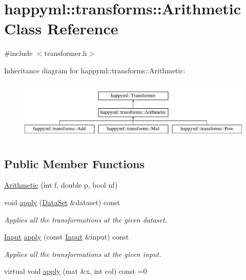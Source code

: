 \hypertarget{classhappyml_1_1transforms_1_1Arithmetic}{}\section{happyml\+:\+:transforms\+:\+:Arithmetic Class Reference}
\label{classhappyml_1_1transforms_1_1Arithmetic}


{\ttfamily \#include $<$transformer.\+h$>$}

Inheritance diagram for happyml\+:\+:transforms\+:\+:Arithmetic\+:\begin{figure}[H]
\begin{center}
\leavevmode
\includegraphics[height=2.886598cm]{classhappyml_1_1transforms_1_1Arithmetic}
\end{center}
\end{figure}
\subsection*{Public Member Functions}
\begin{DoxyCompactItemize}
\item 
\hyperlink{classhappyml_1_1transforms_1_1Arithmetic_a0a57820a202d232af4527a2bb4ecf67a}{Arithmetic} (int f, double p, bool nf)
\item 
void \hyperlink{classhappyml_1_1transforms_1_1Arithmetic_aafe6e2ef231e5515f2068b8340aac93a}{apply} (\hyperlink{classhappyml_1_1DataSet}{Data\+Set} \&dataset) const 
\begin{DoxyCompactList}\small\item\em Applies all the transformations at the given dataset. \end{DoxyCompactList}\item 
\hyperlink{namespacehappyml_a03602d1ec49393790b8a0449f40cd01f}{Input} \hyperlink{classhappyml_1_1transforms_1_1Arithmetic_ac32e38e089435dc407bc9b7a338bc845}{apply} (const \hyperlink{namespacehappyml_a03602d1ec49393790b8a0449f40cd01f}{Input} \&input) const 
\begin{DoxyCompactList}\small\item\em Applies all the transformations at the given input. \end{DoxyCompactList}\item 
virtual void \hyperlink{classhappyml_1_1transforms_1_1Arithmetic_a85191dcd8734e18424b92b870d7b9d73}{apply} (mat \&x, int col) const  =0
\end{DoxyCompactItemize}

